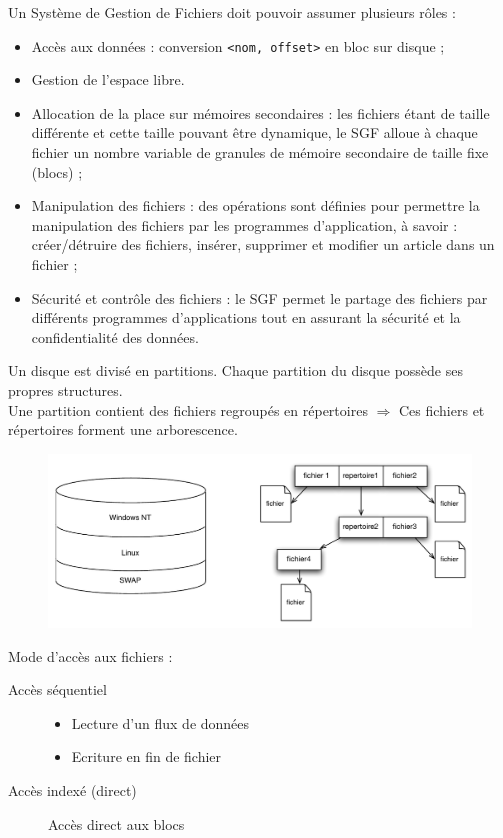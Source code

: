 \documentclass[11pt,english,french]{scrreprt}
\theoremstyle{remark}
\theoremstyle{definition}
\begin{document}
Un Système de Gestion de Fichiers doit pouvoir assumer plusieurs rôles :
\begin{itemize}
	\item Accès aux données : conversion \lstinline!<nom, offset>! en bloc sur disque ;
	\item Gestion de l'espace libre.
	\item Allocation de la place sur mémoires secondaires : les fichiers étant de taille différente et cette taille pouvant être dynamique, le SGF alloue à chaque fichier un nombre variable de granules de mémoire secondaire de taille fixe (blocs) ;
	\item Manipulation des fichiers : des opérations sont définies pour permettre la manipulation des fichiers par les programmes d’application, à savoir : créer/détruire des fichiers, insérer, supprimer et modifier un article dans un fichier ;
	\item Sécurité et contrôle des fichiers : le SGF permet le partage des fichiers par différents programmes d’applications tout en assurant la sécurité et la confidentialité des données. 
\end{itemize}

Un disque est divisé en partitions. Chaque partition du disque possède ses propres structures.\\
Une partition contient des fichiers regroupés en répertoires $\Rightarrow$ Ces fichiers et répertoires forment une arborescence.

\begin{figure}[h!]
	\center
	\vspace{-15pt}
	\includegraphics[scale=.7]{img/arborescenceSGF}
	\vspace{-15pt}
\end{figure}

Mode d'accès aux fichiers : 
\begin{description}
\item [Accès séquentiel] \hfill
\begin{itemize}
	\item Lecture d'un flux de données
	\item Ecriture en fin de fichier
\end{itemize}
\item [Accès indexé (direct)] Accès direct aux blocs
\end{description}
\end{document}
